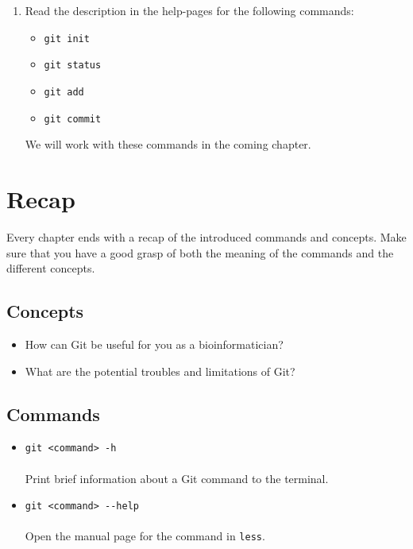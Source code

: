 \documentclass[../main/git_course_main.tex]{subfiles}
\begin{document}
\begin{enumerate}
\item Read the description in the help-pages for the following commands:

\begin{itemize}
	\item \verb$git init$
	\item \verb$git status$
	\item \verb$git add$
	\item \verb$git commit$
\end{itemize}

We will work with these commands in the coming chapter.

\end{enumerate}

\newpage
\section{Recap}

Every chapter ends with a recap of the introduced commands and concepts. Make sure that you have a good grasp of both the meaning of the commands 
and the different concepts.

\subsection{Concepts}

\begin{itemize}
\item How can Git be useful for you as a bioinformatician?
\item What are the potential troubles and limitations of Git?
\end{itemize}

\subsection{Commands}

\begin{itemize}
	\item \verb$git <command> -h$ \\\\
	Print brief information about a Git command to the terminal.
	\item \verb$git <command> --help$ \\\\
	Open the manual page for the command in \verb$less$.
\end{itemize}
\end{document}
